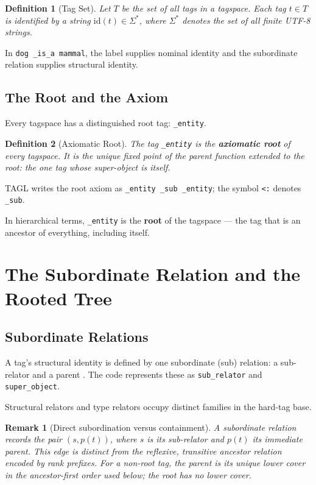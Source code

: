 \documentclass{article}
\newtheorem{definition}{Definition}[section]
\newtheorem{remark}{Remark}[section]
\begin{document}
\begin{definition}[Tag Set]
Let $T$ be the set of all tags in a tagspace. Each tag $t \in T$ is identified
by a string $\mathrm{id}(t) \in \Sigma^*$, where $\Sigma^*$ denotes the set of
all finite UTF-8 strings.
\end{definition}

In \texttt{dog \_is\_a mammal}, the label supplies nominal identity and the
subordinate relation supplies structural identity.

\subsection{The Root and the Axiom}

Every tagspace has a distinguished root tag: \texttt{\_entity}.

\begin{definition}[Axiomatic Root]
The tag \texttt{\_entity} is the \textbf{axiomatic root} of every tagspace. It
is the unique fixed point of the parent function extended to the root: the one tag whose
super-object is itself.
\end{definition}

TAGL writes the root axiom as \texttt{\_entity \_sub \_entity}; the symbol
\texttt{<:} denotes \texttt{\_sub}.

In hierarchical terms, \texttt{\_entity} is the \textbf{root} of the tagspace
--- the tag that is an ancestor of everything, including itself.

\section{The Subordinate Relation and the Rooted Tree}

\subsection{Subordinate Relations}

A tag's structural identity is defined by one subordinate (sub) relation:
a sub-relator and a parent \cite{spec,thesis}. The code represents these as
\texttt{sub\_relator} and \texttt{super\_object}.

Structural relators and type relators occupy distinct families in the hard-tag base.

\begin{remark}[Direct subordination versus containment]
A subordinate relation records the pair $(s,p(t))$, where $s$ is its
sub-relator and $p(t)$ its immediate parent. This edge is distinct from the
reflexive, transitive ancestor relation encoded by rank prefixes. For a
non-root tag, the parent is its unique lower cover in the ancestor-first
order used below; the root has no lower cover.
\end{remark}
\end{document}
